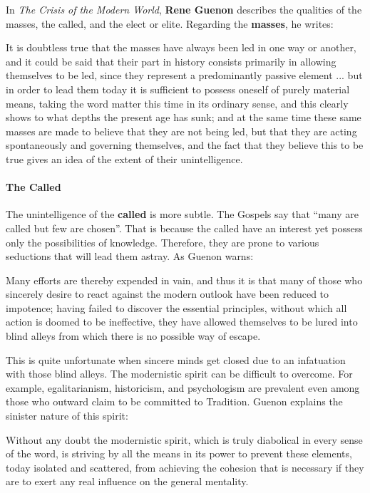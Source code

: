 In \emph{The Crisis of the Modern World}, \textbf{Rene Guenon} describes the qualities of the masses, the called, and the elect or elite. Regarding the \textbf{masses}, he writes:

\begin{quotex}
It is doubtless true that the masses have always been led in one way or another, and it could be said that their part in history consists primarily in allowing themselves to be led, since they represent a predominantly passive element ... but in order to lead them today it is sufficient to possess oneself of purely material means, taking the word matter this time in its ordinary sense, and this clearly shows to what depths the present age has sunk; and at the same time these same masses are made to believe that they are not being led, but that they are acting spontaneously and governing themselves, and the fact that they believe this to be true gives an idea of the extent of their unintelligence.
\end{quotex}


\paragraph{The Called}


The unintelligence of the \textbf{called} is more subtle. The Gospels say that ``many are called but few are chosen''. That is because the called have an interest yet possess only the possibilities of knowledge. Therefore, they are prone to various seductions that will lead them astray. As Guenon warns:

\begin{quotex}
Many efforts are thereby expended in vain, and thus it is that many of those who sincerely desire to react against the modern outlook have been reduced to impotence; having failed to discover the essential principles, without which all action is doomed to be ineffective, they have allowed themselves to be lured into blind alleys from which there is no possible way of escape.
\end{quotex}


This is quite unfortunate when sincere minds get closed due to an infatuation with those blind alleys. The modernistic spirit can be difficult to overcome. For example, egalitarianism, historicism, and psychologism are prevalent even among those who outward claim to be committed to Tradition. Guenon explains the sinister nature of this spirit:

\begin{quotex}
Without any doubt the modernistic spirit, which is truly diabolical in every sense of the word, is striving by all the means in its power to prevent these elements, today isolated and scattered, from achieving the cohesion that is necessary if they are to exert any real influence on the general mentality.
\end{quotex}


